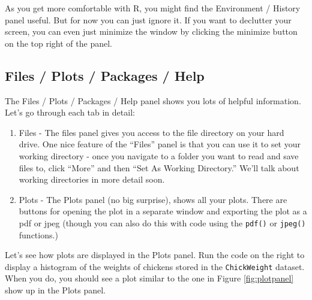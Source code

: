 \documentclass[]{book}
\newenvironment{Shaded}{\begin{snugshade}}{\end{snugshade}}
\newcommand{\KeywordTok}[1]{\textcolor[rgb]{0.13,0.29,0.53}{\textbf{#1}}}
\newcommand{\DataTypeTok}[1]{\textcolor[rgb]{0.13,0.29,0.53}{#1}}
\newcommand{\StringTok}[1]{\textcolor[rgb]{0.31,0.60,0.02}{#1}}
\newcommand{\OperatorTok}[1]{\textcolor[rgb]{0.81,0.36,0.00}{\textbf{#1}}}
\newcommand{\NormalTok}[1]{#1}
\theoremstyle{definition}
\theoremstyle{definition}
\theoremstyle{remark}
\begin{document}
As you get more comfortable with R, you might find the Environment /
History panel useful. But for now you can just ignore it. If you want to
declutter your screen, you can even just minimize the window by clicking
the minimize button on the top right of the panel.

\subsection{Files / Plots / Packages /
Help}\label{files-plots-packages-help}

The Files / Plots / Packages / Help panel shows you lots of helpful
information. Let's go through each tab in detail:

\begin{enumerate}
\def\labelenumi{\arabic{enumi}.}
\item
  Files - The files panel gives you access to the file directory on your
  hard drive. One nice feature of the ``Files'' panel is that you can
  use it to set your working directory - once you navigate to a folder
  you want to read and save files to, click ``More'' and then ``Set As
  Working Directory.'' We'll talk about working directories in more
  detail soon.
\item
  Plots - The Plots panel (no big surprise), shows all your plots. There
  are buttons for opening the plot in a separate window and exporting
  the plot as a pdf or jpeg (though you can also do this with code using
  the \texttt{pdf()} or \texttt{jpeg()} functions.)
\end{enumerate}

Let's see how plots are displayed in the Plots panel. Run the code on
the right to display a histogram of the weights of chickens stored in
the \texttt{ChickWeight} dataset. When you do, you should see a plot
similar to the one in Figure \ref{fig:plotpanel} show up in the Plots
panel.

\begin{Shaded}
\end{Shaded}
\end{document}

